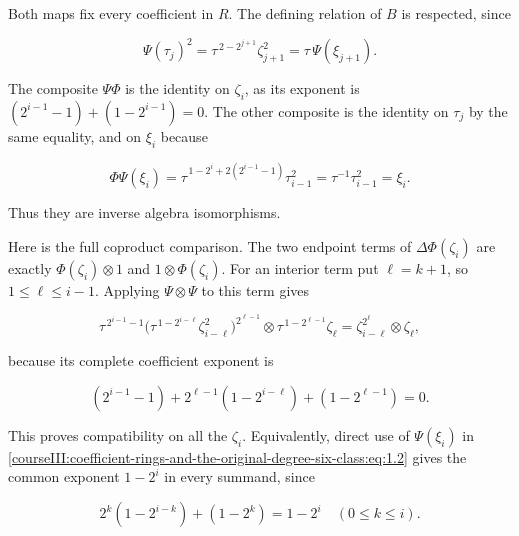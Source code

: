 Both maps fix every coefficient in \(R\). The defining relation of \(B\) is respected, since

\begin{equation}
\Psi(\tau_j)^2
   =\tau^{\,2-2^{j+1}}\zeta_{j+1}^2
   =\tau\,\Psi(\xi_{j+1}).
 \label{courseIII:coefficient-rings-and-the-original-degree-six-class:eq:1.5}
\end{equation}

The composite \(\Psi\Phi\) is the identity on \(\zeta_i\), as its exponent is
\((2^{i-1}-1)+(1-2^{i-1})=0\). The other composite is the identity on \(\tau_j\) by the same equality, and on \(\xi_i\) because

\begin{equation}
\Phi\Psi(\xi_i)
  =\tau^{\,1-2^i+2(2^{i-1}-1)}\tau_{i-1}^2
  =\tau^{-1}\tau_{i-1}^2=\xi_i.
 \label{courseIII:coefficient-rings-and-the-original-degree-six-class:eq:1.6}
\end{equation}

Thus they are inverse algebra isomorphisms.

Here is the full coproduct comparison. The two endpoint terms of \(\Delta\Phi(\zeta_i)\) are exactly \(\Phi(\zeta_i)\otimes1\) and \(1\otimes\Phi(\zeta_i)\). For an interior term put \(\ell=k+1\), so \(1\leq\ell\leq i-1\). Applying \(\Psi\otimes\Psi\) to this term gives

\begin{equation}
\tau^{\,2^{i-1}-1}
 \bigl(\tau^{\,1-2^{i-\ell}}\zeta_{i-\ell}^2\bigr)^{2^{\ell-1}}
 \otimes
 \tau^{\,1-2^{\ell-1}}\zeta_\ell
   =\zeta_{i-\ell}^{2^\ell}\otimes\zeta_\ell,
 \label{courseIII:coefficient-rings-and-the-original-degree-six-class:eq:1.7}
\end{equation}

because its complete coefficient exponent is

\begin{equation}
(2^{i-1}-1)+2^{\ell-1}(1-2^{i-\ell})
                            +(1-2^{\ell-1})=0.
 \label{courseIII:coefficient-rings-and-the-original-degree-six-class:eq:1.8}
\end{equation}

This proves compatibility on all the \(\zeta_i\). Equivalently, direct use of \(\Psi(\xi_i)\) in \eqref{courseIII:coefficient-rings-and-the-original-degree-six-class:eq:1.2} gives the common exponent \(1-2^i\) in every summand, since

\begin{equation}
2^k(1-2^{i-k})+(1-2^k)=1-2^i
                        \quad(0\leq k\leq i).
 \label{courseIII:coefficient-rings-and-the-original-degree-six-class:eq:1.9}
\end{equation}

